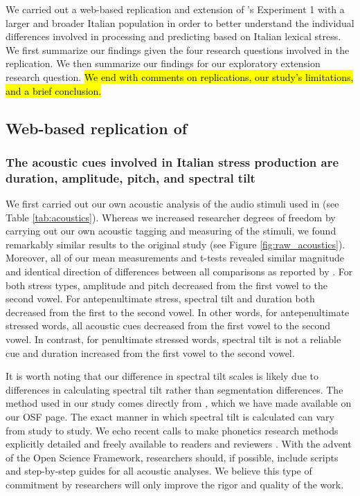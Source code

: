 We carried out a web-based replication and extension of \cite{Sulpizio_McQueen_2012}'s Experiment 1 with a larger and broader Italian population in order to better understand the individual differences involved in processing and predicting based on Italian lexical stress. We first summarize our findings given the four research questions involved in the replication. We then summarize our findings for our exploratory extension research question. \hl{We end with comments on replications, our study's limitations, and a brief conclusion.}

\subsection{Web-based replication of \cite{Sulpizio_McQueen_2012}}
\subsubsection{The acoustic cues involved in Italian stress production are duration, amplitude, pitch, and spectral tilt}
We first carried out our own acoustic analysis of the audio stimuli used in \cite{Sulpizio_McQueen_2012} (see Table \ref{tab:acoustics}). Whereas we increased researcher degrees of freedom \citep{Corretta2023, roettger2019researcher} by carrying out our own acoustic tagging and measuring of the stimuli, we found remarkably similar results to the original study (see Figure \ref{fig:raw_acoustics}). Moreover, all of our mean measurements and t-tests revealed similar magnitude and identical direction of differences between all comparisons as reported by \cite{Sulpizio_McQueen_2012}. For both stress types, amplitude and pitch decreased from the first vowel to the second vowel. For antepenultimate stress, spectral tilt and duration both decreased from the first to the second vowel. In other words, for antepenultimate stressed words, all acoustic cues decreased from the first vowel to the second vowel. In contrast, for penultimate stressed words, spectral tilt is not a reliable cue and duration increased from the first vowel to the second vowel.

It is worth noting that our difference in spectral tilt scales is likely due to differences in calculating spectral tilt rather than segmentation differences. The method used in our study comes directly from \cite{sluijter1996spectral,cutler2007dutch}, which we have made available on our OSF page. The exact manner in which spectral tilt is calculated can vary from study to study. We echo recent calls to make phonetics research methods explicitly detailed and freely available to readers and reviewers \citep{roettger2019emergent, roettger2019researcher}. With the advent of the Open Science Framework, researchers should, if possible, include scripts and step-by-step guides for all acoustic analyses. We believe this type of commitment by researchers will only improve the rigor and quality of the work.

